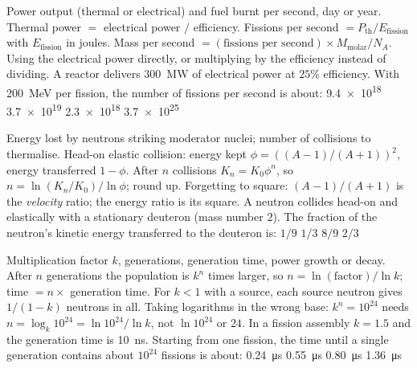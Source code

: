 {Power output (thermal or electrical) and fuel burnt per second, day or year.}
{Thermal power $=$ electrical power $/$ efficiency. Fissions per second $=P_{\text{th}}/E_{\text{fission}}$
with $E_{\text{fission}}$ in joules. Mass per second $=(\text{fissions per second})\times M_{\text{molar}}/N_A$.}
{Using the electrical power directly, or multiplying by the efficiency instead of dividing.}
{A reactor delivers \SI{300}{MW} of electrical power at $25\%$ efficiency. With \SI{200}{\MeV} per
fission, the number of fissions per second is about:}
{\num{9.4e18}}
{\num{3.7e19}}
{\num{2.3e18}}
{\num{3.7e25}}

{Energy lost by neutrons striking moderator nuclei; number of collisions to thermalise.}
{Head-on elastic collision: energy kept $\phi=((A-1)/(A+1))^2$, energy transferred $1-\phi$. After $n$
collisions $K_n=K_0\phi^n$, so $n=\ln(K_n/K_0)/\ln\phi$; round up.}
{Forgetting to square: $(A-1)/(A+1)$ is the \emph{velocity} ratio; the energy ratio is its square.}
{A neutron collides head-on and elastically with a stationary deuteron (mass number $2$). The fraction
of the neutron's kinetic energy transferred to the deuteron is:}
{$1/9$}
{$1/3$}
{$8/9$}
{$2/3$}

{Multiplication factor $k$, generations, generation time, power growth or decay.}
{After $n$ generations the population is $k^n$ times larger, so $n=\ln(\text{factor})/\ln k$; time
$=n\times$ generation time. For $k<1$ with a source, each source neutron gives $1/(1-k)$ neutrons in all.}
{Taking logarithms in the wrong base: $k^n=10^{24}$ needs $n=\log_k 10^{24}=\ln10^{24}/\ln k$, not
$\ln10^{24}$ or $24$.}
{In a fission assembly $k=1.5$ and the generation time is \SI{10}{ns}. Starting from one fission, the time
until a single generation contains about $10^{24}$ fissions is about:}
{\SI{0.24}{\micro s}}
{\SI{0.55}{\micro s}}
{\SI{0.80}{\micro s}}
{\SI{1.36}{\micro s}}


